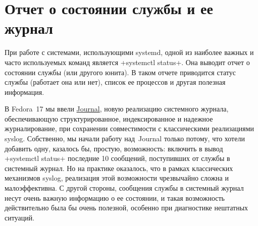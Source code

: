 \documentclass[10pt,oneside,a4paper]{article}
\begin{document}
\section{Отчет о состоянии службы и ее журнал}
\label{sec:journal}

При работе с системами, использующими systemd, одной из наиболее важных и часто
используемых команд является +systemctl status+. Она выводит отчет о состоянии
службы (или другого юнита). В таком отчете приводится статус службы (работает
она или нет), список ее процессов и другая полезная информация.

В Fedora~17 мы ввели
\href{http://0pointer.de/blog/projects/the-journal.html}{Journal}, новую
реализацию системного журнала, обеспечивающую структурированное, индексированное
и надежное журналирование, при сохранении совместимости с классическими
реализациями syslog. Собственно, мы начали работу над~Journal только потому, что
хотели добавить одну, казалось бы, простую, возможность: включить в вывод
+systemctl status+ последние 10 сообщений, поступивших от службы в системный
журнал. Но на практике оказалось, что в рамках классических механизмов syslog,
реализация этой возможности чрезвычайно сложна и малоэффективна. С другой
стороны, сообщения службы в системный журнал несут очень важную информацию о ее
состоянии, и такая возможность действительно была бы очень полезной, особенно
при диагностике нештатных ситуаций.
\end{document}
